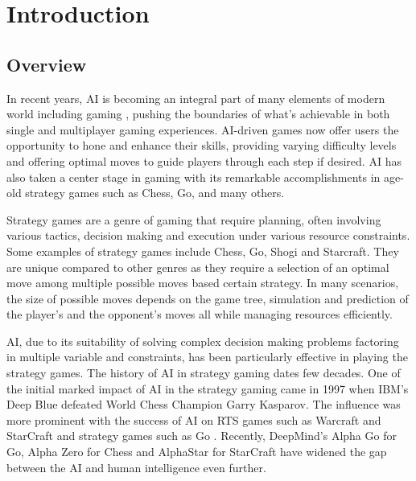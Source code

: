 \chapter{Introduction}

\section{Overview}
In recent years, \gls{AI} is becoming an integral part of many elements of modern world including gaming \citep{Skinner2010Artificial}, pushing the boundaries of what's achievable in both single and multiplayer gaming experiences. \gls{AI}-driven games now offer users the opportunity to hone and enhance their skills, providing varying difficulty levels and offering optimal moves to guide players through each step if desired. \gls{AI} has also taken a center stage in gaming with its remarkable accomplishments in age-old strategy games such as Chess, Go, and many others. 

% 

Strategy games are a genre of gaming that require planning, often involving various tactics, decision making and execution under various resource constraints. Some examples of strategy games include Chess, Go, Shogi and Starcraft. They are unique compared to other genres as they require a selection of an optimal move among multiple possible moves based certain strategy. In many scenarios, the size of possible moves depends on the game tree, simulation and prediction of the player's and the opponent's moves all while managing resources efficiently.

\gls{AI}, due to its suitability of solving complex decision making problems factoring in multiple variable and constraints, has been particularly effective in playing the strategy games. The history of \gls{AI} in strategy gaming dates few decades. One of the initial marked impact of \gls{AI} in the strategy gaming came in 1997 when IBM's Deep Blue \citep{Campbell2002Deep} defeated World Chess Champion Garry Kasparov. The influence was more prominent with the success of \gls{AI} on \gls{RTS} games such as Warcraft and StarCraft \citep{Robertson2014Review} and strategy games such as Go \citep{Huang2011Monte}. Recently, DeepMind's Alpha Go for Go, Alpha Zero for Chess \citep{Silver2017Mastering} and AlphaStar for StarCraft \citep{Team2019Alphastar} have widened the gap between the \gls{AI} and human intelligence even further.


